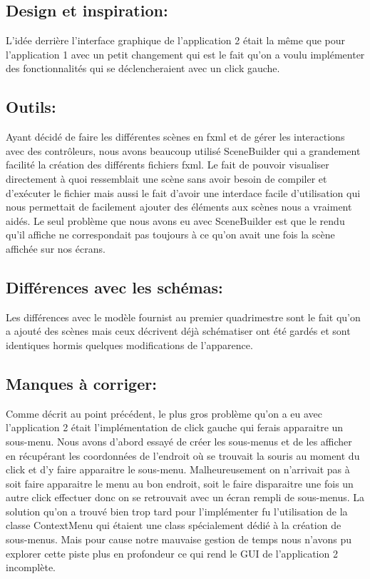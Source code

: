 \documentclass[../rapport.tex]{subfiles}
\begin{document}
\subsection{Design et inspiration:}
    
L'idée derrière l'interface graphique de l'application 2 était la même que pour l'application 1 avec un petit changement qui est le fait 
qu'on a voulu implémenter des fonctionnalités qui se déclencheraient avec un click gauche.


\subsection{Outils:}

    Ayant décidé de faire les différentes scènes en fxml et de gérer les interactions avec des contrôleurs, nous avons beaucoup utilisé 
    SceneBuilder qui a grandement facilité la création des différents fichiers fxml. Le fait de pouvoir visualiser directement à quoi ressemblait
    une scène sans avoir besoin de compiler et d'exécuter le fichier mais aussi le fait d'avoir une interdace facile d'utilisation qui nous 
    permettait de facilement ajouter des éléments aux scènes nous a vraiment aidés. Le seul problème que nous avons eu avec SceneBuilder est que
    le rendu qu'il affiche ne correspondait pas toujours à ce qu'on avait une fois la scène affichée sur nos écrans.


\subsection{Différences avec les schémas:}

    Les différences avec le modèle fournist au premier quadrimestre sont le fait qu'on a ajouté des scènes mais ceux décrivent déjà schématiser 
    ont été gardés et sont identiques hormis quelques modifications de l'apparence.


\subsection{Manques à corriger:}

    Comme décrit au point précédent, le plus gros problème qu'on a eu avec l'application 2 était l'implémentation de click gauche qui
    ferais apparaitre un sous-menu. Nous avons d'abord essayé de créer les sous-menus et de les afficher en récupérant les coordonnées de 
    l'endroit où se trouvait la souris au moment du click et d'y faire apparaitre le sous-menu. Malheureusement on n'arrivait pas à 
    soit faire apparaitre le menu au bon endroit, soit le faire disparaitre une fois un autre click effectuer donc on se retrouvait 
    avec un écran rempli de sous-menus. La solution qu'on a trouvé bien trop tard pour l'implémenter fu l'utilisation de la classe
    ContextMenu qui étaient une class spécialement dédié à la création de sous-menus. Mais pour cause notre mauvaise gestion de temps
    nous n'avons pu explorer cette piste plus en profondeur ce qui rend le GUI de l'application 2 incomplète.

    \newpage
\end{document}
